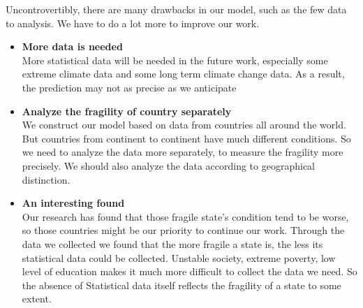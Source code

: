 \documentclass{mcmthesis}
\begin{document}
		Uncontrovertibly, there are many drawbacks in our model, such as the few data to analysis. We have to do a lot more to improve our work.
		
		\begin{itemize}
			
			\item \textbf{More data is needed}\\More statistical data will be needed in the future work, especially some extreme climate data and some long term climate change data. As a result, the prediction may not as precise as we anticipate
			
			\item \textbf{Analyze the fragility of country separately}\\We construct our model based on data from countries all around the world. But countries from continent to continent have much different conditions. So we need to analyze the data more separately, to measure the fragility more precisely. We should also analyze the data according to geographical distinction.
			
			\item \textbf{An interesting found}\\Our research has found that those fragile state’s condition tend to be worse, so those countries might be our priority to continue our work. Through the data we collected we found that the more fragile a state is, the less its statistical data could be collected. Unstable society, extreme poverty, low level of education makes it much more difficult to collect the data we need. So the absence of Statistical data itself reflects the fragility of a state to some extent. 
			
		\end{itemize}

	\nocite{*}
		
	\newpage
\end{document}

